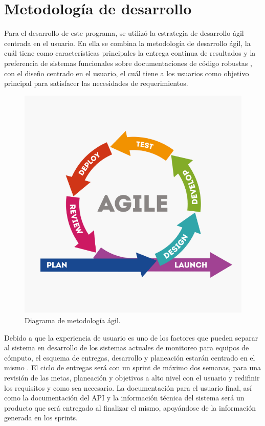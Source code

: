 \section{Metodología de desarrollo}


Para el desarrollo de este programa, se utilizó la estrategia de desarrollo ágil centrada en el usuario. En ella se combina la metodología de desarrollo ágil, la cuál tiene como características principales la entrega continua de resultados y la preferencia de sistemas funcionales sobre documentaciones de código robustas \cite{agile_manifesto}, con el diseño centrado en el usuario, el cuál tiene a los usuarios como objetivo principal para satisfacer las necesidades de requerimientos.

\begin{figure}[!ht]
	\centering
	\includegraphics[width=.75\linewidth]{images/agil.png}
	\caption{Diagrama de metodología ágil.}
	\label{fig:conexion_redundancia}
\end{figure}

Debido a que la experiencia de usuario es uno de los factores que pueden separar al sistema en desarrollo de los sistemas actuales de monitoreo para equipos de cómputo, el esquema de entregas, desarrollo y planeación estarán centrado en el mismo \cite{hussain_agile_usercentered}. El ciclo de entregas será con un sprint de máximo dos semanas, para una revisión de las metas, planeación y objetivos a alto nivel con el usuario y redifinir los requisitos y como sea necesario. La documentación para el usuario final, así como la documentación del API y la información técnica del sistema será un producto que será entregado al finalizar el mismo, apoyándose de la información generada en los sprints.

